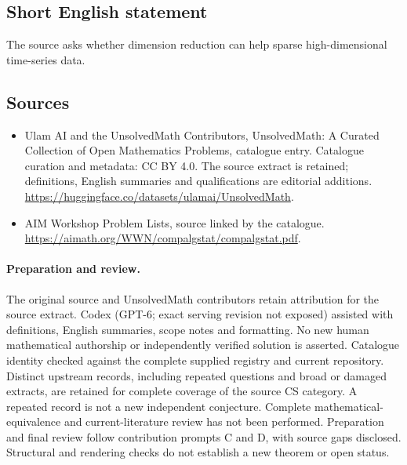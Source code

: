 \documentclass[11pt]{article}
\begin{document}
\subsection{Short English statement}
The source asks whether dimension reduction can help sparse high-dimensional time-series data.
\subsection{Sources}
\begin{itemize}
\item[\hypertarget{source:statement:1}{S1}] Ulam AI and the UnsolvedMath Contributors, UnsolvedMath: A Curated Collection of Open Mathematics Problems, catalogue entry. Catalogue curation and metadata: CC BY 4.0. The source extract is retained; definitions, English summaries and qualifications are editorial additions.
\url{https://huggingface.co/datasets/ulamai/UnsolvedMath}.
\item[\hypertarget{source:statement:2}{S2}] AIM Workshop Problem Lists, source linked by the catalogue.
\url{https://aimath.org/WWN/compalgstat/compalgstat.pdf}.
\end{itemize}
\paragraph{Preparation and review.}
The original source and UnsolvedMath contributors retain attribution for the source extract. Codex (GPT-6; exact serving revision not exposed) assisted with definitions, English summaries, scope notes and formatting. No new human mathematical authorship or independently verified solution is asserted. Catalogue identity checked against the complete supplied registry and current repository. Distinct upstream records, including repeated questions and broad or damaged extracts, are retained for complete coverage of the source CS category. A repeated record is not a new independent conjecture. Complete mathematical-equivalence and current-literature review has not been performed. Preparation and final review follow contribution prompts C and D, with source gaps disclosed. Structural and rendering checks do not establish a new theorem or open status.
\label{end:statement}
\end{document}
